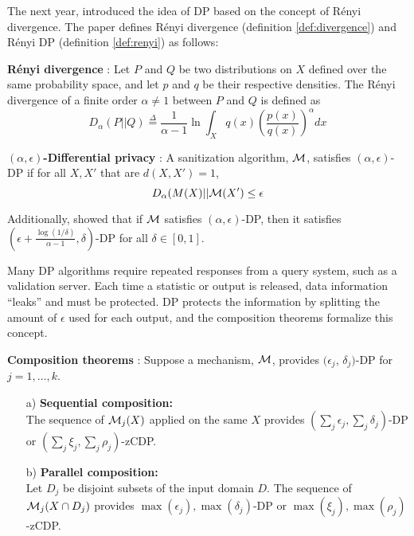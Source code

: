 The next year, \citet{mironov2017renyi} introduced the idea of DP based on the concept of R\'enyi divergence. The paper defines R\'enyi divergence (definition \ref{def:divergence}) and R\'enyi DP (definition \ref{def:renyi}) as follows:

\begin{defn}\label{def:divergence} \textbf{R\'enyi divergence} \citep{renyi1961measures}: Let $P$ and $Q$ be two distributions on $X$ defined over the same probability space, and let $p$ and $q$ be their respective densities. The R\'enyi divergence of a finite order $\alpha\neq1$ between $P$ and $Q$ is defined as
    \begin{equation}
        D_\alpha(P||Q)\stackrel{\Delta}{=}\frac{1}{\alpha-1}\ln\int_X q(x)\left(\frac{p(x)}{q(x)}\right)^\alpha dx
    \end{equation}
\end{defn}

\begin{defn}\label{def:renyi} \textbf{$(\alpha, \epsilon)$-Differential privacy} \citep{mironov2017renyi}: A sanitization algorithm, $\mathcal{M}$, satisfies $(\alpha, \epsilon)$-DP if for all $X, X'$ that are $d(X,X')=1$,
    \begin{equation}
        D_\alpha(M(X)||\mathcal{M}(X')\leq\epsilon
    \end{equation}
\end{defn}

Additionally, \citet{mironov2017renyi} showed that if $\mathcal{M}$ satisfies $(\alpha,\epsilon)$-DP, then it satisfies $\left(\epsilon + \frac{\log(1/\delta)}{\alpha-1}, \delta \right)$-DP for all $\delta\in[0,1]$.

Many DP algorithms require repeated responses from a query system, such as a validation server. Each time a statistic or output is released, data information ``leaks'' and must be protected. DP protects the information by splitting the amount of $\epsilon$ used for each output, and the composition theorems formalize this concept.

\begin{thm}\label{thm:comp} \textbf{Composition theorems} \citep{mcsherry2009privacy,dwork2016concentrated,bun2016concentrated}:
Suppose a mechanism, $\mathcal{M}$, provides $(\epsilon_j$, $\delta_j)$-DP for $j=1,\ldots,k$.
  \begin{itemize}\setlength{\itemindent}{15pt}
  \item[a)] \textbf{Sequential composition:}\\
    The sequence of $\mathcal{M}_j(X)$ applied on the same $X$ provides $(\sum_j\epsilon_j,\sum_j\delta_j)$-DP or $(\sum_j\xi_j,\sum_j\rho_j)$-zCDP.
  \item[b)] \textbf{Parallel composition:}\\
    Let  $D_j$ be disjoint subsets of the input domain $D$. The sequence of $\mathcal{M}_j(X\cap D_j)$ provides $\max(\epsilon_j), \max(\delta_j)$-DP or $\max(\xi_j), \max(\rho_j)$-zCDP.
  \end{itemize}
\end{thm}

